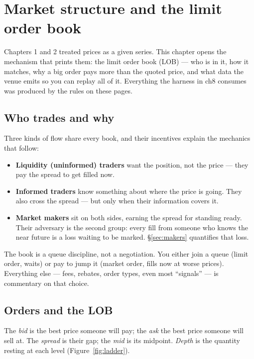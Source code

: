 \chapter{Market structure and the limit order book}\label{ch:lob}
Chapters 1 and 2 treated prices as a given series. This chapter opens
the mechanism that prints them: the limit order book (LOB) --- who is
in it, how it matches, why a big order pays more than the quoted
price, and what data the venue emits so you can replay all of it.
Everything the harness in ch8 consumes was produced by the rules on
these pages.

\section{Who trades and why}\label{sec:whotrades}
Three kinds of flow share every book, and their incentives explain
the mechanics that follow:

\begin{itemize}
\item \textbf{Liquidity (uninformed) traders} want the position, not
the price --- they pay the spread to get filled now.
\item \textbf{Informed traders} know something about where the price
is going. They also cross the spread --- but only when their
information covers it.
\item \textbf{Market makers} sit on both sides, earning the spread
for standing ready. Their adversary is the second group: every fill
from someone who knows the near future is a loss waiting to be
marked. \S\ref{sec:makers} quantifies that loss.
\end{itemize}

The book is a queue discipline, not a negotiation. You either join a
queue (limit order, waits) or pay to jump it (market order, fills
now at worse prices). Everything else --- fees, rebates, order
types, even most ``signals'' --- is commentary on that choice.

\section{Orders and the LOB}\label{sec:orders}
The \emph{bid} is the best price someone will pay; the \emph{ask}
the best price someone will sell at. The \emph{spread} is their gap;
the \emph{mid} is its midpoint. \emph{Depth} is the quantity resting
at each level (Figure~\ref{fig:ladder}).

